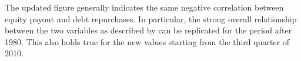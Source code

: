 The updated figure generally indicates the same negative correlation between equity payout and debt repurchases. In particular, the strong overall relationship between the two variables as described by \citeauthor{JERMANNfinancial} can be replicated for the period after 1980. This also holds true for the new values starting from the third quarter of 2010. 

